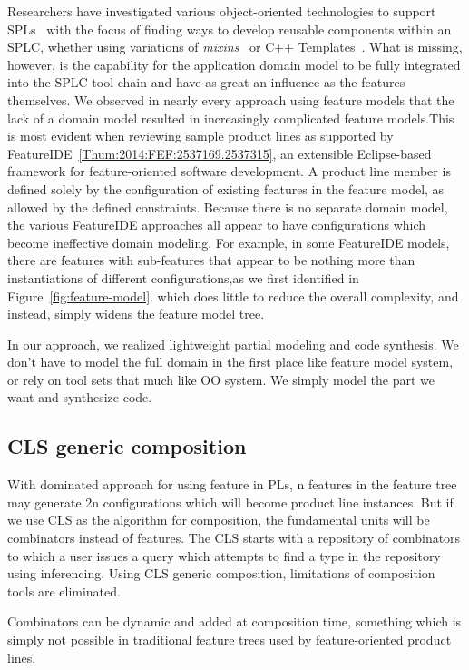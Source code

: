 Researchers have investigated various object-oriented technologies to
support SPLs~\cite{Griss1999,Batory2000} with the focus of finding ways
to develop reusable components within an SPLC, whether using variations
of \textit{mixins}~\cite{Bracha:1990:MI:97946.97982} or C++
Templates~\cite{VanHilst:1996:UCT:646898.710025}. What is missing,
however, is the capability for the application domain model to be fully
integrated into the SPLC tool chain and have as great an influence as
the features themselves. We observed in nearly every approach using
feature models that the lack of a domain model resulted in increasingly
complicated feature models.This is most
evident when reviewing sample product lines as supported by
FeatureIDE~\ref{Thum:2014:FEF:2537169.2537315}, an extensible
Eclipse-based framework for feature-oriented software development. A
product line member is defined solely by the configuration of existing
features in the feature model, as allowed by the defined constraints.
Because there is no separate domain model, the various FeatureIDE
approaches all appear to have configurations which become ineffective
domain modeling. For example, in some FeatureIDE models, there are
features with sub-features that appear to be nothing more than
instantiations of different configurations,as we first identified in Figure~\ref{fig:feature-model}.  which does little to reduce
the overall complexity, and instead, simply widens the feature model tree.

In our approach, we realized lightweight partial modeling and code synthesis.
We don't have to model the full domain in the first place like feature model system,
or rely on tool sets that much like OO system. We simply model the part we want and synthesize
code.

\subsection{CLS generic composition}

With dominated approach for using feature in PLs, n features in the
feature tree may generate 2n configurations which will become product
line instances. But if we use CLS as the algorithm for composition, the
fundamental units will be combinators instead of features. The CLS
starts with a repository of combinators to which a user issues a query
which attempts to find a type in the repository using inferencing. Using
CLS generic composition, limitations of composition tools are
eliminated.


Combinators can be dynamic and added at composition time, something
which is simply not possible in traditional feature trees used by
feature-oriented product lines.

